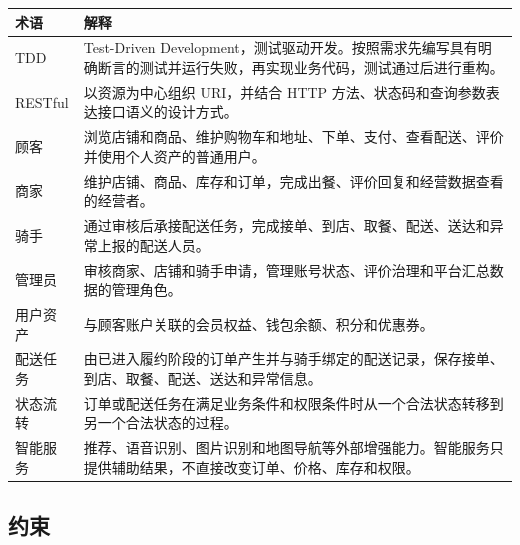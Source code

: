 \begin{longtable}{|>{\raggedright\arraybackslash}p{}|>{\raggedright\arraybackslash}p{}|}
\hline
\textbf{术语} & \textbf{解释} \\ \hline
TDD & Test-Driven Development，测试驱动开发。按照需求先编写具有明确断言的测试并运行失败，再实现业务代码，测试通过后进行重构。 \\ \hline
RESTful & 以资源为中心组织 URI，并结合 HTTP 方法、状态码和查询参数表达接口语义的设计方式。 \\ \hline
顾客 & 浏览店铺和商品、维护购物车和地址、下单、支付、查看配送、评价并使用个人资产的普通用户。 \\ \hline
商家 & 维护店铺、商品、库存和订单，完成出餐、评价回复和经营数据查看的经营者。 \\ \hline
骑手 & 通过审核后承接配送任务，完成接单、到店、取餐、配送、送达和异常上报的配送人员。 \\ \hline
管理员 & 审核商家、店铺和骑手申请，管理账号状态、评价治理和平台汇总数据的管理角色。 \\ \hline
用户资产 & 与顾客账户关联的会员权益、钱包余额、积分和优惠券。 \\ \hline
配送任务 & 由已进入履约阶段的订单产生并与骑手绑定的配送记录，保存接单、到店、取餐、配送、送达和异常信息。 \\ \hline
状态流转 & 订单或配送任务在满足业务条件和权限条件时从一个合法状态转移到另一个合法状态的过程。 \\ \hline
智能服务 & 推荐、语音识别、图片识别和地图导航等外部增强能力。智能服务只提供辅助结果，不直接改变订单、价格、库存和权限。 \\ \hline
\end{longtable}

\subsection{约束}

